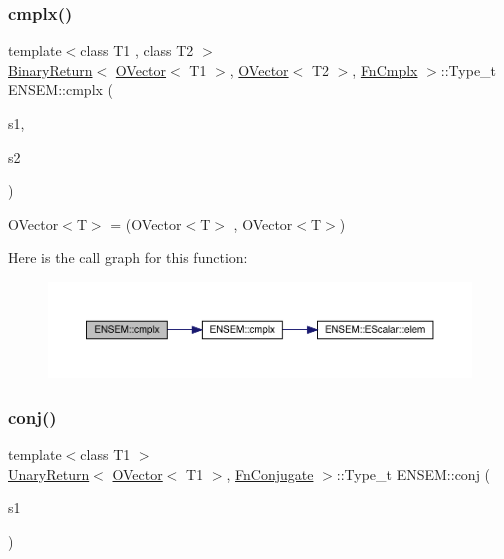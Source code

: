 \subsubsection{\texorpdfstring{cmplx()}{cmplx()}}
{\footnotesize\ttfamily template$<$class T1 , class T2 $>$ \\
\mbox{\hyperlink{structENSEM_1_1BinaryReturn}{Binary\+Return}}$<$ \mbox{\hyperlink{classENSEM_1_1OVector}{O\+Vector}}$<$ T1 $>$, \mbox{\hyperlink{classENSEM_1_1OVector}{O\+Vector}}$<$ T2 $>$, \mbox{\hyperlink{structENSEM_1_1FnCmplx}{Fn\+Cmplx}} $>$\+::Type\+\_\+t E\+N\+S\+E\+M\+::cmplx (\begin{DoxyParamCaption}\item[{const \mbox{\hyperlink{classENSEM_1_1OVector}{O\+Vector}}$<$ T1 $>$ \&}]{s1,  }\item[{const \mbox{\hyperlink{classENSEM_1_1OVector}{O\+Vector}}$<$ T2 $>$ \&}]{s2 }\end{DoxyParamCaption})\hspace{0.3cm}{\ttfamily [inline]}}



O\+Vector$<$\+T$>$ = (O\+Vector$<$\+T$>$ , O\+Vector$<$\+T$>$) 

Here is the call graph for this function\+:\nopagebreak
\begin{figure}[H]
\begin{center}
\leavevmode
\includegraphics[width=350pt]{da/d59/group__obsvector_ga363734253f08749647255a90c647284c_cgraph}
\end{center}
\end{figure}
\mbox{\label{group__obsvector_ga77a1805866a66a7f5215fb784b9c2725}} 
\subsubsection{\texorpdfstring{conj()}{conj()}}
{\footnotesize\ttfamily template$<$class T1 $>$ \\
\mbox{\hyperlink{structENSEM_1_1UnaryReturn}{Unary\+Return}}$<$ \mbox{\hyperlink{classENSEM_1_1OVector}{O\+Vector}}$<$ T1 $>$, \mbox{\hyperlink{structENSEM_1_1FnConjugate}{Fn\+Conjugate}} $>$\+::Type\+\_\+t E\+N\+S\+E\+M\+::conj (\begin{DoxyParamCaption}\item[{const \mbox{\hyperlink{classENSEM_1_1OVector}{O\+Vector}}$<$ T1 $>$ \&}]{s1 }\end{DoxyParamCaption})\hspace{0.3cm}{\ttfamily [inline]}}

